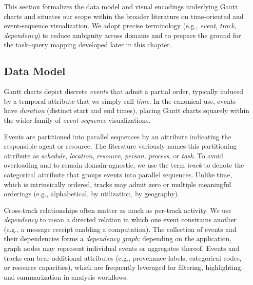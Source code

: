 \begin{refsection}
This section formalizes the data model and visual encodings underlying Gantt charts and situates our scope within the broader literature on time-oriented and event-sequence visualization. We adopt precise terminology (e.g., \emph{event}, \emph{track}, \emph{dependency}) to reduce ambiguity across domains and to prepare the ground for the task--query mapping developed later in this chapter.


\subsection{Data Model}
\label{subsec:gantt-data}
Gantt charts depict discrete \emph{events} that admit a partial order, typically induced by a temporal attribute that we simply call \emph{time}. In the canonical use, events have \emph{duration} (distinct start and end times), placing Gantt charts squarely within the wider family of \emph{event-sequence} visualizations.

Events are partitioned into parallel sequences by an attribute indicating the responsible agent or resource. The literature variously names this partitioning attribute as \emph{schedule}, \emph{location}, \emph{resource}, \emph{person}, \emph{process}, or \emph{task}. To avoid overloading and to remain domain-agnostic, we use the term \emph{track} to denote the categorical attribute that groups events into parallel sequences. Unlike time, which is intrinsically ordered, tracks may admit zero or multiple meaningful orderings (e.g., alphabetical, by utilization, by geography).

Cross-track relationships often matter as much as per-track activity. We use \emph{dependency} to mean a directed relation in which one event constrains another (e.g., a message receipt enabling a computation). The collection of events and their dependencies forms a \emph{dependency graph}; depending on the application, graph nodes may represent individual events or aggregates thereof. Events and tracks can bear additional attributes (e.g., provenance labels, categorical codes, or resource capacities), which are frequently leveraged for filtering, highlighting, and summarization in analysis workflows.



\end{refsection}
